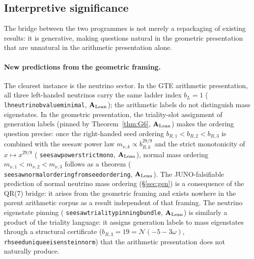 \documentclass[11pt]{article}
\theoremstyle{remark}
\newcommand{\lean}[1]{%
  \penalty-100
  \begingroup\def\_{\textunderscore\allowbreak}\texttt{#1}\endgroup}
\newcommand{\CatAL}{\ensuremath{\textbf{A}_{\rm Lean}}}
\begin{document}
\subsection{Interpretive significance}

The bridge between the two programmes is not merely a repackaging of existing
results: it is generative, making questions natural in the geometric presentation
that are unnatural in the arithmetic presentation alone.

\paragraph{New predictions from the geometric framing.}
The clearest instance is the neutrino sector.
In the GTE arithmetic presentation, all three left-handed neutrinos carry the
same ladder index $b_L = 1$ (\lean{lh\_neutrino\_b\_value\_minimal}, \CatAL);
the arithmetic labels do not distinguish mass eigenstates.
In the geometric presentation, the triality-slot assignment of generation labels
(pinned by Theorem~\ref{thm:G6}, \CatAL) makes the ordering question precise:
once the right-handed seed ordering $b_{R,1} < b_{R,2} < b_{R,3}$ is combined
with the seesaw power law $m_{\nu,k} \propto b_{R,k}^{29/9}$ and the strict
monotonicity of $x\mapsto x^{29/9}$
(\lean{seesaw\_power\_strict\_mono}, \CatAL),
normal mass ordering $m_{\nu,1} < m_{\nu,2} < m_{\nu,3}$ follows as a theorem
(\lean{seesaw\_normal\_ordering\_from\_seed\_ordering}, \CatAL).
The JUNO-falsifiable prediction of normal neutrino mass ordering (\S\ref{sec:gen})
is a consequence of the QR(7) bridge: it arises from the geometric framing
and exists nowhere in the parent arithmetic corpus as a result independent
of that framing.
The neutrino eigenstate pinning
(\lean{seesaw\_triality\_pinning\_bundle}, \CatAL) is similarly a product
of the triality language: it assigns generation labels to mass eigenstates
through a structural certificate
($b_{R,3} = 19 = \mathcal{N}(-5-3\omega)$, \lean{rh\_seed\_unique\_eisenstein\_norm})
that the arithmetic presentation does not naturally produce.
\end{document}
